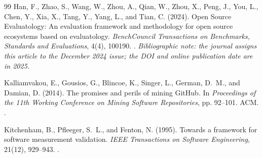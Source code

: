 \begin{thebibliography}{99}
Han, F., Zhao, S., Wang, W., Zhou, A., Qian, W., Zhou, X., Peng, J., You, L., Chen, Y., Xia, X., Tang, Y., Yang, L., and Tian, C. (2024).
Open Source Evaluatology: An evaluation framework and methodology for open source ecosystems based on evaluatology.
\emph{BenchCouncil Transactions on Benchmarks, Standards and Evaluations}, 4(4), 100190.
.
\emph{Bibliographic note: the journal assigns this article to the December 2024 issue; the DOI and online publication date are in 2025.}

Kalliamvakou, E., Gousios, G., Blincoe, K., Singer, L., German, D.~M., and Damian, D. (2014).
The promises and perils of mining GitHub.
In \emph{Proceedings of the 11th Working Conference on Mining Software Repositories}, pp. 92--101. ACM.
.

Kitchenham, B., Pfleeger, S.~L., and Fenton, N. (1995).
Towards a framework for software measurement validation.
\emph{IEEE Transactions on Software Engineering}, 21(12), 929--943.
.

\end{thebibliography}
\clearpage
\begingroup
\renewcommand{\bibsection}{\section*{References\enspace{\normalfont\sffamily\fontsize{11}{14}\selectfont continued}}}
